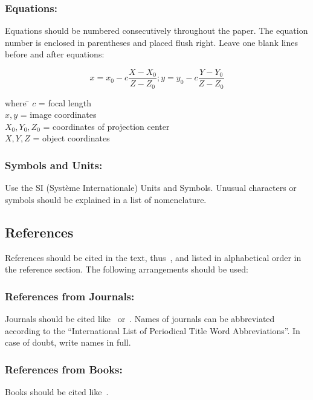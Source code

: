 \documentclass{isprs} %
\begin{document}
\subsubsection{Equations:}\label{sec:Equations}

Equations should be numbered consecutively throughout the paper. The equation 
number is enclosed in parentheses and placed flush right. Leave one blank lines 
before and after equations: 


\begin{equation}\label{equ:1}
	x = x_0 -c \frac{X - X_0}{Z - Z_0}; y = y_0 -c \frac{Y - Y_0}{Z - Z_0}
\end{equation}

\begin{tabbing} 
where \hspace{0.6cm} \= $c$ = focal length\\
\> $x,y$ = image coordinates\\
\> $X_0,Y_0, Z_0$ = coordinates of projection center\\
\> $X, Y, Z$ = object coordinates
\end{tabbing}

\subsubsection{Symbols and Units:}\label{sec:Symbols and Units}
Use the SI (Syst\`{e}me Internationale) Units and Symbols. Unusual characters 
or symbols should be explained in a list of nomenclature.

\subsection{References}\label{sec:References}
References should be cited in the text, thus~\cite{smith1987rep}, and listed in alphabetical order in the reference section. The following arrangements should be used:

\subsubsection{References from Journals:} 
Journals should be cited like~\cite{smith1987} or~\cite{michalis2008}. Names of journals can be abbreviated according to the ``International List of Periodical Title Word Abbreviations''. In case of doubt, write names in full.

\subsubsection{References from Books:} 
Books should be cited like~\cite{foerstner2016}.
\end{document}
